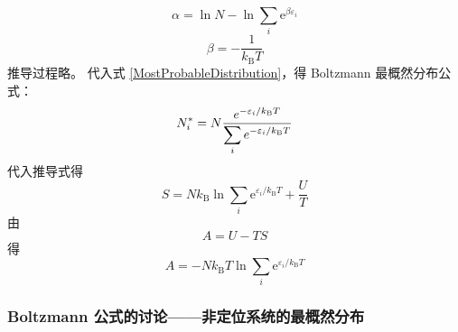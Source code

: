 \begin{equation*}
    \alpha = \ln{N} - \ln{\sum_{i} \mathrm{e}^{\beta \varepsilon_i}}
\end{equation*}
\begin{equation}
    \beta = -\frac1{k_\mathrm{B} T}
\end{equation}
推导过程略。
代入式 \eqref{MostProbableDistribution}，得 Boltzmann 最概然分布公式：
\begin{equation}
    N^*_i = N \frac{e^{-\varepsilon_i / k_\mathrm{B} T}}{\displaystyle\sum_{i} e^{-\varepsilon_i / k_\mathrm{B} T}}
    \label{BoltzmannMostProbableDistribution}
\end{equation}
代入推导式得
\begin{equation}
    S = N k_\mathrm{B} \ln{\sum_{i} \mathrm{e}^{\varepsilon_i / k_\mathrm{B} T}} + \frac{U}{T}
\end{equation}
由
\begin{equation*}
    A = U - T S
\end{equation*}
得
\begin{equation}
    A = -N k_\mathrm{B} T \ln{\sum_{i} \mathrm{e}^{\varepsilon_i / k_\mathrm{B} T}}
\end{equation}

\subsubsection{Boltzmann 公式的讨论——非定位系统的最概然分布}

